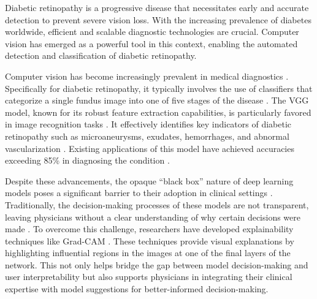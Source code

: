 Diabetic retinopathy is a progressive disease that necessitates early and accurate detection to prevent severe vision loss. With the increasing prevalence of diabetes worldwide, efficient and scalable diagnostic technologies are crucial. Computer vision has emerged as a powerful tool in this context, enabling the automated detection and classification of diabetic retinopathy.

Computer vision has become increasingly prevalent in medical diagnostics \cite{esteva_deep_2021}. Specifically for diabetic retinopathy, it typically involves the use of classifiers that categorize a single fundus image into one of five stages of the disease \cite{mateen_fundus_2019}. The VGG model, known for its robust feature extraction capabilities, is particularly favored in image recognition tasks \cite{mateen_fundus_2019, kaur_automated_2019, ha_image_2018, varshni_pneumonia_2019, chaib_deep_2017, lu_feature_2017, majib_vgg-scnet_2021, tammina_transfer_2019}. It effectively identifies key indicators of diabetic retinopathy such as microaneurysms, exudates, hemorrhages, and abnormal vascularization \cite{hwang_optical_2015-2}. Existing applications of this model have achieved accuracies exceeding 85\% in diagnosing the condition \cite{noauthor_diabetic_nodate}.

Despite these advancements, the opaque ``black box'' nature of deep learning models poses a significant barrier to their adoption in clinical settings \cite{guidotti_survey_2018}. Traditionally, the decision-making processes of these models are not transparent, leaving physicians without a clear understanding of why certain decisions were made \cite{guidotti_survey_2018}. To overcome this challenge, researchers have developed explainability techniques like Grad-CAM \cite{selvaraju_grad-cam_2017}. These techniques provide visual explanations by highlighting influential regions in the images at one of the final layers of the network. This not only helps bridge the gap between model decision-making and user interpretability but also supports physicians in integrating their clinical expertise with model suggestions for better-informed decision-making.